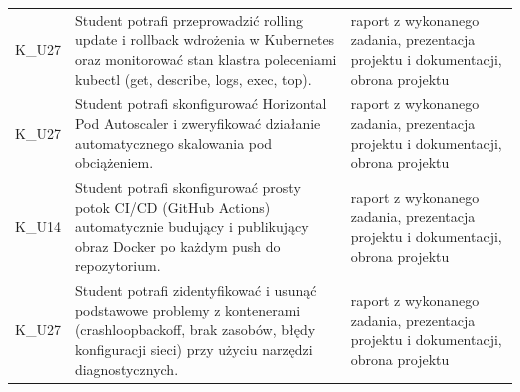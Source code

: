 \documentclass[12pt, a4paper]{article}
\begin{document}
{\begin{longtable}{m{1.6cm}m{9.0cm}m{4.2cm}}
  \rowcolor{tableRowLight} K\_U27 & Student potrafi przeprowadzić rolling update i rollback wdrożenia w Kubernetes oraz monitorować stan klastra poleceniami kubectl (get, describe, logs, exec, top). & raport z wykonanego zadania, prezentacja projektu i dokumentacji, obrona projektu \\
  \rowcolor{tableRowAlt} K\_U27 & Student potrafi skonfigurować Horizontal Pod Autoscaler i zweryfikować działanie automatycznego skalowania pod obciążeniem. & raport z wykonanego zadania, prezentacja projektu i dokumentacji, obrona projektu \\
  \rowcolor{tableRowLight} K\_U14 & Student potrafi skonfigurować prosty potok CI/CD (GitHub Actions) automatycznie budujący i publikujący obraz Docker po każdym push do repozytorium. & raport z wykonanego zadania, prezentacja projektu i dokumentacji, obrona projektu \\
  \rowcolor{tableRowAlt} K\_U27 & Student potrafi zidentyfikować i usunąć podstawowe problemy z kontenerami (crashloopbackoff, brak zasobów, błędy konfiguracji sieci) przy użyciu narzędzi diagnostycznych. & raport z wykonanego zadania, prezentacja projektu i dokumentacji, obrona projektu \\
\bottomrule
\end{longtable}}
\end{document}
